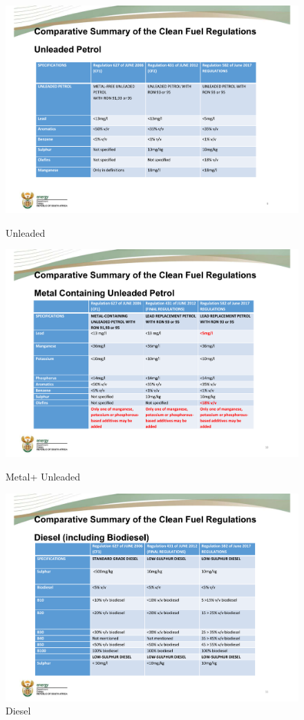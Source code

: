 \begin{figure}[!htb]
	\includegraphics[width=\linewidth]{introduction/fig/page1Comp.pdf}
	\caption{Unleaded\cite{2007Comparison}}\label{fig:fig1}
	\endminipage\hfill
	\includegraphics[width=\linewidth]{introduction/fig/page2Comp.pdf}
	\caption{Metal+ Unleaded\cite{2007Comparison}}\label{fig:fig2}
	\endminipage\hfill
	\includegraphics[width=\linewidth]{introduction/fig/page3Comp.pdf}
	\caption{Diesel\cite{2007Comparison}}\label{fig:fig3}
	\endminipage
\end{figure}

